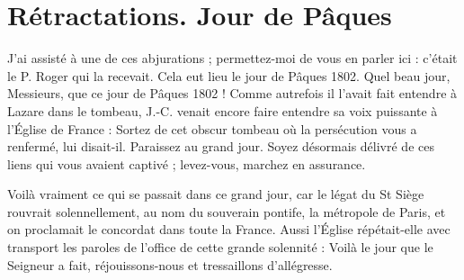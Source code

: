 \section*{Rétractations. Jour de Pâques}
J'ai assisté à une de ces abjurations ; permettez-moi de vous en parler ici : c'était le P. Roger qui la recevait. Cela eut lieu le jour de Pâques 1802. Quel beau jour, Messieurs, que ce jour de Pâques 1802 ! Comme autrefois il l'avait fait entendre à Lazare dans le tombeau, J.-C. venait encore faire entendre sa voix puissante à l'Église de France : Sortez de cet obscur tombeau où la persécution vous a renfermé, lui disait-il. Paraissez au grand jour. Soyez désormais délivré de ces liens qui vous avaient captivé ; levez-vous, marchez en assurance.

Voilà vraiment ce qui se passait dans ce grand jour, car le légat du St Siège rouvrait solennellement, au nom du souverain pontife, la métropole de Paris, et on proclamait le concordat dans toute la France. Aussi l'Église répétait-elle avec transport les paroles de l'office de cette grande solennité : Voilà le jour que le Seigneur a fait, réjouissons-nous et tressaillons d'allégresse.

